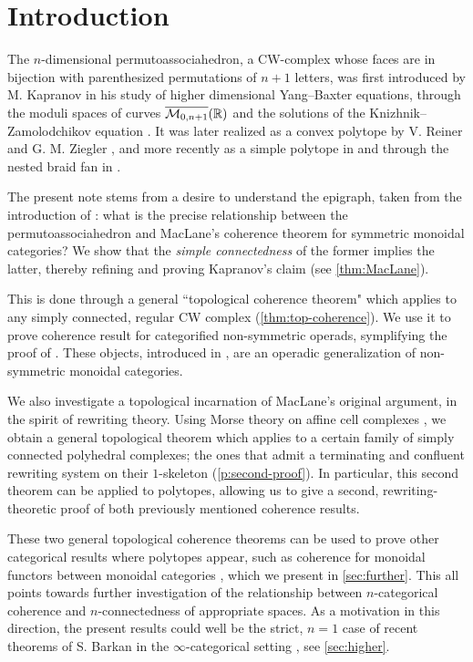 
\section*{Introduction} 
\label{s:introduction}

The $n$-dimensional permutoassociahedron, a CW-complex whose faces are in bijection with parenthesized permutations of $n+1$ letters, was first introduced by M. Kapranov in his study of higher dimensional Yang--Baxter equations, through the moduli spaces of curves $\overline{\mathcal{M}_{0,n+1}}(\mathbb R)$ and the solutions of the Knizhnik--Zamolodchikov equation \cite{kapranov1993}.
It was later realized as a convex polytope by V. Reiner and G. M. Ziegler \cite{reinerCoxeterassociahedra1994}, and more recently as a simple polytope in \cite{baralicSimplePermutoassociahedron2019} and through the nested braid fan in \cite{CastilloLiu21}.

The present note stems from a desire to understand the epigraph, taken from the introduction of \cite{kapranov1993}: what is the precise relationship between the permutoassociahedron and MacLane's coherence theorem for symmetric monoidal categories? 
We show that the \emph{simple connectedness} of the former implies the latter, thereby refining and proving Kapranov's claim (see \cref{thm:MacLane}).

This is done through a general ``topological coherence theorem" which applies to any simply connected, regular CW complex (\cref{thm:top-coherence}).
We use it to prove coherence result for categorified non-symmetric operads, symplifying the proof of \cite{DP15}. 
These objects, introduced in \cite{DP15}, are an operadic generalization of non-symmetric monoidal categories. 

We also investigate a topological incarnation of MacLane's original argument, in the spirit of rewriting theory. 
Using Morse theory on affine cell complexes \cite{bestvinaMorseTheoryFiniteness1997}, we obtain a general topological theorem which applies to a certain family of simply connected polyhedral complexes; the ones that admit a terminating and confluent rewriting system on their $1$-skeleton (\cref{p:second-proof}). 
In particular, this second theorem can be applied to polytopes, allowing us to give a second, rewriting-theoretic proof of both previously mentioned coherence results. 

These two general topological coherence theorems can be used to prove other categorical results where polytopes appear, such as coherence for monoidal functors between monoidal categories \cite{epsteinFunctorsTensoredCategories1966}, which we present in \cref{sec:further}.
This all points towards further investigation of the relationship between $n$-categorical coherence and $n$-connectedness of appropriate spaces.
As a motivation in this direction, the present results could well be the strict, $n=1$ case of recent theorems of S. Barkan in the $\infty$-categorical setting \cite{barkanArityApproximationInfty2022}, see \cref{sec:higher}.


